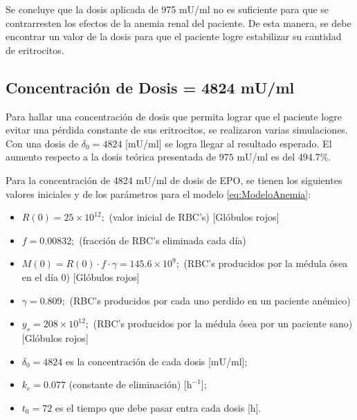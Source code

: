 Se concluye que la dosis aplicada de 975 mU/ml no es suficiente para que se contrarresten los efectos de la anemia renal del paciente. De esta manera, se debe encontrar un valor de la dosis para que el paciente logre estabilizar su cantidad de eritrocitos.

\subsection{Concentración de Dosis = 4824 mU/ml}\label{subsec:variaciones:anemia:bien}

Para hallar una concentración de dosis que permita lograr que el paciente logre evitar una pérdida constante de sus eritrocitos, se realizaron varias simulaciones. Con una dosis de $\delta_0 = 4824$ [mU/ml] se logra llegar al resultado esperado. El aumento respecto a la dosis teórica presentada de $975$ mU/ml es del 494.7$\%$. 

Para la concentración de 4824 mU/ml de dosis de EPO, se tienen los siguientes valores iniciales y de los parámetros para el modelo \ref{eq:ModeloAnemia}:

\begin{itemize}
    \item $R(0) = 25\times 10^{12};$ (valor inicial de RBC's) [Glóbulos rojos]
    \item $f=0.00832;$ (fracción de RBC's eliminada cada día)
    \item $M(0) = R(0)\cdot f \cdot \gamma = 145.6\times 10^{9};$ (RBC's producidos por la médula ósea en el día 0) [Glóbulos rojos]
    \item $\gamma = 0.809;$ (RBC's producidos por cada uno perdido en un paciente anémico) 
    \item $y_s = 208\times 10^{12};$ (RBC's producidos por la médula ósea por un paciente sano) [Glóbulos rojos]
    \item $\delta_0=4824$ es la concentración de cada dosis [mU/ml];
    \item $k_e=0.077$ (constante de eliminación) [$\textrm{h}^{-1}$];
    \item $t_0=72$ es el tiempo que debe pasar entra cada dosis [h].
\end{itemize}

